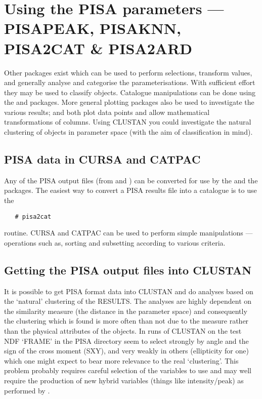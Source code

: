 \section{\sloppy Using the PISA parameters --- PISAPEAK, PISAKNN, PISA2CAT \&
                 PISA2ARD}

Other packages exist which can be used to perform selections,
transform values, and generally analyse and categorise the
 parameterisations.
With sufficient effort they may be used to classify objects.
Catalogue manipulations can be done using the  and  packages.
More general plotting packages also be used to investigate the various
results;  and 
both plot data points and allow mathematical transformations of
columns.
Using CLUSTAN you could investigate the natural clustering of objects
in parameter space (with the aim of classification in mind).

\subsection{PISA data in CURSA and CATPAC}

Any of the PISA output files (from  and
) can be converted for use by the  and the  packages.
The easiest way to convert a PISA results file into a catalogue is to
use the
\begin{verbatim}
   # pisa2cat
\end{verbatim}
routine. CURSA and CATPAC can be used to perform simple manipulations
--- operations such as, sorting and subsetting according to various
criteria.

\subsection{Getting the PISA output files into CLUSTAN}

It is possible to get PISA format data into CLUSTAN and do analyses
based on the `natural' clustering of the RESULTS.
The analyses are highly dependent on the similarity measure (the
distance in the parameter space) and consequently the clustering which
is found is more often than not due to the measure rather than the
physical attributes of the objects.
In runs of CLUSTAN on the test NDF `FRAME' in the PISA directory seem
to select strongly by angle and the sign of the cross moment (SXY),
and very weakly in others (ellipticity for one) which one might expect
to bear more relevance to the real `clustering'.
This problem probably requires careful selection of the variables to
use and may well require the production of new hybrid variables
(things like intensity/peak) as performed by .


